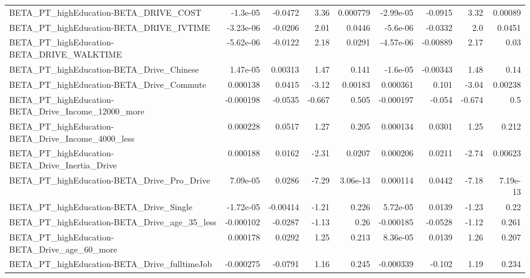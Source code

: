 \begin{tabular}{lrrrrrrrr}
BETA\_PT\_highEducation-BETA\_DRIVE\_COST              &    -1.3e-05 &      -0.0472 &     3.36 & 0.000779 &  -2.99e-05 &     -0.0915 &         3.32 &       0.00089 \\
BETA\_PT\_highEducation-BETA\_DRIVE\_IVTIME            &   -3.23e-06 &      -0.0206 &     2.01 &   0.0446 &   -5.6e-06 &     -0.0332 &          2.0 &        0.0451 \\
BETA\_PT\_highEducation-BETA\_DRIVE\_WALKTIME          &   -5.62e-06 &      -0.0122 &     2.18 &   0.0291 &  -4.57e-06 &    -0.00889 &         2.17 &          0.03 \\
BETA\_PT\_highEducation-BETA\_Drive\_Chinese           &    1.47e-05 &      0.00313 &     1.47 &    0.141 &   -1.6e-05 &    -0.00343 &         1.48 &          0.14 \\
BETA\_PT\_highEducation-BETA\_Drive\_Commute           &    0.000138 &       0.0415 &    -3.12 &  0.00183 &   0.000361 &       0.101 &        -3.04 &       0.00238 \\
BETA\_PT\_highEducation-BETA\_Drive\_Income\_12000\_more &   -0.000198 &      -0.0535 &   -0.667 &    0.505 &  -0.000197 &      -0.054 &       -0.674 &           0.5 \\
BETA\_PT\_highEducation-BETA\_Drive\_Income\_4000\_less  &    0.000228 &       0.0517 &     1.27 &    0.205 &   0.000134 &      0.0301 &         1.25 &         0.212 \\
BETA\_PT\_highEducation-BETA\_Drive\_Inertia\_Drive     &    0.000188 &       0.0162 &    -2.31 &   0.0207 &   0.000206 &      0.0211 &        -2.74 &       0.00623 \\
BETA\_PT\_highEducation-BETA\_Drive\_Pro\_Drive         &    7.09e-05 &       0.0286 &    -7.29 & 3.06e-13 &   0.000114 &      0.0442 &        -7.18 &      7.19e-13 \\
BETA\_PT\_highEducation-BETA\_Drive\_Single            &   -1.72e-05 &     -0.00414 &    -1.21 &    0.226 &   5.72e-05 &      0.0139 &        -1.23 &          0.22 \\
BETA\_PT\_highEducation-BETA\_Drive\_age\_35\_less       &   -0.000102 &      -0.0287 &    -1.13 &     0.26 &  -0.000185 &     -0.0528 &        -1.12 &         0.261 \\
BETA\_PT\_highEducation-BETA\_Drive\_age\_60\_more       &    0.000178 &       0.0292 &     1.25 &    0.213 &   8.36e-05 &      0.0139 &         1.26 &         0.207 \\
BETA\_PT\_highEducation-BETA\_Drive\_fulltimeJob       &   -0.000275 &      -0.0791 &     1.16 &    0.245 &  -0.000339 &      -0.102 &         1.19 &         0.234 \\

\end{tabular}
